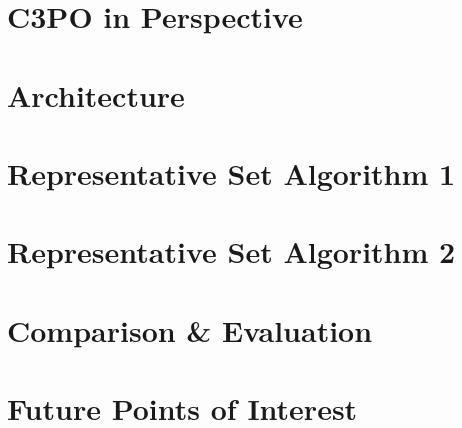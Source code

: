 \section{C3PO in Perspective}

\section{Architecture}

\section{Representative Set Algorithm 1}

\section{Representative Set Algorithm 2}

\section{Comparison \& Evaluation}

\section{Future Points of Interest}
